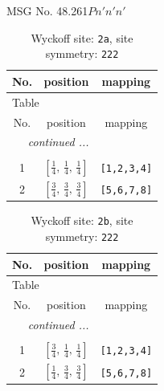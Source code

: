 \documentclass[fleqn,8pt]{jsarticle}
\begin{document}
\setcounter{MaxMatrixCols}{32}

\renewcommand{\tablename}{Table~}
\renewcommand{\figurename}{Figure~}
\begin{center}
\LARGE
MSG No. 48.261\quad$Pn'n'n'$
\end{center}
\renewcommand{\arraystretch}{1.2}
\begin{longtable}{ccc}
\caption{Wyckoff site: {\tt 2a}, site symmetry: {\tt 222}}
 \\
 \hline \hline
No. & position & mapping \\ \hline \endfirsthead

\multicolumn{2}{l}{\tablename\ \thetable{}} \\
 \hline \hline
No. & position & mapping \\ \hline \endhead

 \hline \hline
\multicolumn{2}{r}{\footnotesize\it continued ...} \\ \endfoot

 \hline \hline
\multicolumn{2}{r}{} \\ \endlastfoot

1 & $\left[ \frac{1}{4},\, \frac{1}{4},\, \frac{1}{4} \right]$ & {\tt [1,2,3,4]} \\ \hline
2 & $\left[ \frac{3}{4},\, \frac{3}{4},\, \frac{3}{4} \right]$ & {\tt [5,6,7,8]} \\
\end{longtable}
\renewcommand{\arraystretch}{1.2}
\begin{longtable}{ccc}
\caption{Wyckoff site: {\tt 2b}, site symmetry: {\tt 222}}
 \\
 \hline \hline
No. & position & mapping \\ \hline \endfirsthead

\multicolumn{2}{l}{\tablename\ \thetable{}} \\
 \hline \hline
No. & position & mapping \\ \hline \endhead

 \hline \hline
\multicolumn{2}{r}{\footnotesize\it continued ...} \\ \endfoot

 \hline \hline
\multicolumn{2}{r}{} \\ \endlastfoot

1 & $\left[ \frac{3}{4},\, \frac{1}{4},\, \frac{1}{4} \right]$ & {\tt [1,2,3,4]} \\ \hline
2 & $\left[ \frac{1}{4},\, \frac{3}{4},\, \frac{3}{4} \right]$ & {\tt [5,6,7,8]} \\
\end{longtable}
\end{document}
